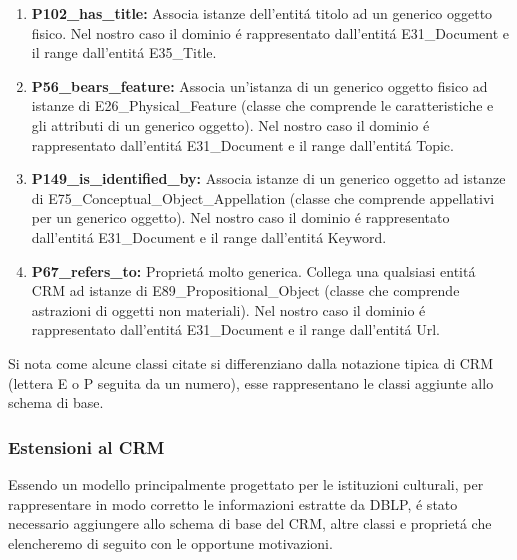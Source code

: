 \documentclass[11pt,a4paper]{article}
\begin{document}
\begin{itemize}
\begin{enumerate}
	 			\item \textbf{P102\_has\_title:} Associa istanze dell'entit\'a titolo ad un generico oggetto fisico. Nel nostro caso il dominio \'e rappresentato dall'entit\'a E31\_Document e il range dall'entit\'a E35\_Title.
	 			
	 			\item \textbf{P56\_bears\_feature:} Associa un'istanza di un generico oggetto fisico ad istanze di E26\_Physical\_Feature (classe che comprende le caratteristiche e gli attributi di un generico oggetto). Nel nostro caso il dominio \'e rappresentato dall'entit\'a E31\_Document e il range dall'entit\'a Topic.
	 			
	 			\item \textbf{P149\_is\_identified\_by:} Associa istanze di un generico oggetto ad istanze di E75\_Conceptual\_Object\_Appellation (classe che comprende appellativi per un generico oggetto). Nel nostro caso il dominio \'e rappresentato dall'entit\'a E31\_Document e il range dall'entit\'a Keyword.
	 			
	 			\item \textbf{P67\_refers\_to:} Propriet\'a molto generica. Collega una qualsiasi entit\'a CRM ad istanze di E89\_Propositional\_Object (classe che comprende astrazioni di oggetti non materiali). Nel nostro caso il dominio \'e rappresentato dall'entit\'a E31\_Document e il range dall'entit\'a Url.
	 			
	 			
	 		\end{enumerate}
	 \end{itemize}
 
 Si nota come alcune classi citate si differenziano dalla notazione tipica di CRM (lettera E o P seguita da un numero), esse rappresentano le classi aggiunte allo schema di base.

  


\subsubsection{Estensioni al CRM}
Essendo un modello principalmente progettato per le istituzioni culturali, per rappresentare in modo corretto le informazioni estratte da DBLP, \'e stato necessario aggiungere allo schema di base del CRM, altre classi e propriet\'a che elencheremo di seguito con le opportune motivazioni.
\end{document}
